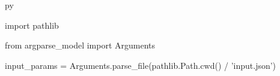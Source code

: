 \begin{pythontexcustomcode}{py}

import pathlib

from argparse_model import Arguments

input_params = Arguments.parse_file(pathlib.Path.cwd() / 'input.json')

\end{pythontexcustomcode}
